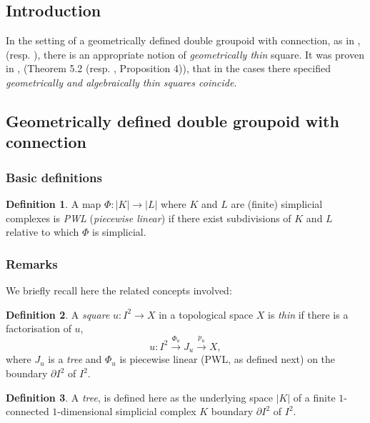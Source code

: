 \documentclass[12pt]{article}
\theoremstyle{plain}
\theoremstyle{definition}
\newtheorem{definition}{Definition}[section]
\numberwithin{equation}{section}
\begin{document}
\subsection{Introduction}  
 In the setting of a geometrically defined double groupoid with connection, as in \cite{BH2}, (resp. \cite{BHKP}), there is an appropriate notion of \emph{geometrically thin} square.  It was proven in \cite{BH2},
(Theorem 5.2 (resp. \cite{BHKP}, Proposition 4)), that in the cases there specified 
\emph{geometrically and algebraically thin squares coincide}.

\subsection{Geometrically defined double groupoid with connection} 

\subsubsection{Basic definitions}

\begin{definition}
A map $ \Phi : |K| \longrightarrow |L| $ where $ K $ and $ L $ are
(finite) simplicial complexes is \emph{PWL} ({\it piecewise linear}) if
there exist subdivisions of $ K $ and $ L $ relative to which $ \Phi$ is simplicial. 
\end{definition}

\subsubsection{Remarks} 

 We briefly recall here the related concepts involved:
 \begin{definition}
A \emph{square} $ u:I^{2} \longrightarrow X $ in a topological space $ X $ is \emph{thin} if there 
is a factorisation of $ u $, $$ u : I^{2} \stackrel{\Phi_{u}}{\longrightarrow}
J_{u} \stackrel{p_{u}}{\longrightarrow} X, $$  where $J_{u}$ is a
\emph{tree} and $ \Phi_{u} $ is piecewise linear (PWL, as defined next) on the
boundary $ \partial{I}^{2} $ of $ I^{2} $. 
\end{definition}

\begin{definition}
A {\it tree}, is defined here as the underlying space $ |K| $ of a
finite $ 1 $-connected $ 1 $-dimensional simplicial complex $ K $ boundary 
$ \partial{I}^{2} $ of $ I^{2} $. 
\end{definition}
\end{document}
